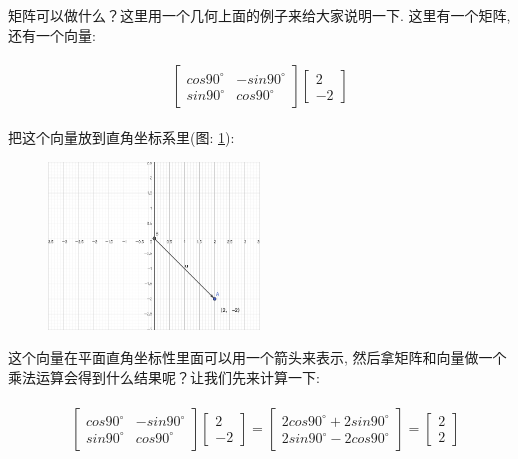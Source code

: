 矩阵可以做什么？这里用一个几何上面的例子来给大家说明一下. 这里有一个矩阵, 还有一个向量:

\begin{align*}
  \begin{split}
    \begin{bmatrix} cos90^\circ & -sin90^\circ \\ sin90^\circ & cos90^\circ \end{bmatrix}
    \begin{bmatrix} 2 \\ -2 \end{bmatrix}
  \end{split}
\end{align*}

把这个向量放到直角坐标系里(图: \ref{fig:img4_1}):

\begin{figure}[ht]
  \centering
  \includegraphics[width=0.5\textwidth]{asset/20230825222021.png}
  \caption{}
  \label{fig:img4_1}
\end{figure}

这个向量在平面直角坐标性里面可以用一个箭头来表示, 然后拿矩阵和向量做一个乘法运算会得到什么结果呢？让我们先来计算一下:

\begin{align*}
  \begin{split}
    & \begin{bmatrix} cos90^\circ & -sin90^\circ \\ sin90^\circ & cos90^\circ \end{bmatrix}
    \begin{bmatrix} 2 \\ -2 \end{bmatrix} 
    = \begin{bmatrix} 2cos90^\circ + 2sin90^\circ \\ 2sin90^\circ - 2cos90^\circ \end{bmatrix} 
    = \begin{bmatrix} 2 \\ 2 \end{bmatrix}
  \end{split}
\end{align*}

